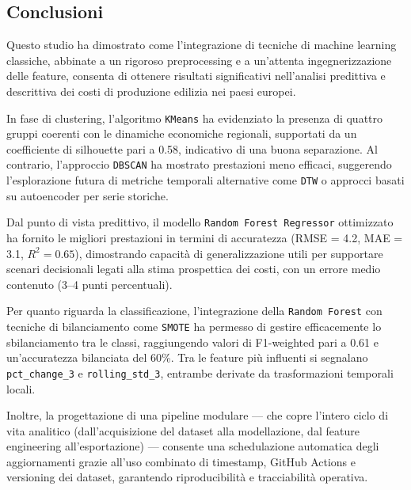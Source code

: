 \documentclass[conference]{IEEEtran}
\begin{document}
\begin{itemize}
{\section*{\LARGE \textbf{Conclusioni}}

Questo studio ha dimostrato come l'integrazione di tecniche di machine learning classiche, abbinate a un rigoroso preprocessing e a un’attenta ingegnerizzazione delle feature, consenta di ottenere risultati significativi nell’analisi predittiva e descrittiva dei costi di produzione edilizia nei paesi europei.

In fase di clustering, l’algoritmo \texttt{KMeans} ha evidenziato la presenza di quattro gruppi coerenti con le dinamiche economiche regionali, supportati da un coefficiente di silhouette pari a 0.58, indicativo di una buona separazione. Al contrario, l’approccio \texttt{DBSCAN} ha mostrato prestazioni meno efficaci, suggerendo l’esplorazione futura di metriche temporali alternative come \texttt{DTW} o approcci basati su autoencoder per serie storiche.

Dal punto di vista predittivo, il modello \texttt{Random Forest Regressor} ottimizzato ha fornito le migliori prestazioni in termini di accuratezza (RMSE = 4.2, MAE = 3.1, $R^2 = 0.65$), dimostrando capacità di generalizzazione utili per supportare scenari decisionali legati alla stima prospettica dei costi, con un errore medio contenuto (3–4 punti percentuali).



Per quanto riguarda la classificazione, l’integrazione della \texttt{Random Forest} con tecniche di bilanciamento come \texttt{SMOTE} ha permesso di gestire efficacemente lo sbilanciamento tra le classi, raggiungendo valori di F1-weighted pari a 0.61 e un'accuratezza bilanciata del 60\%. Tra le feature più influenti si segnalano \texttt{pct\_change\_3} e \texttt{rolling\_std\_3}, entrambe derivate da trasformazioni temporali locali.

Inoltre, la progettazione di una pipeline modulare — che copre l’intero ciclo di vita analitico (dall’acquisizione del dataset alla modellazione, dal feature engineering all’esportazione) — consente una schedulazione automatica degli aggiornamenti grazie all’uso combinato di timestamp, GitHub Actions e versioning dei dataset, garantendo riproducibilità e tracciabilità operativa.

}
\end{itemize}
\end{document}
